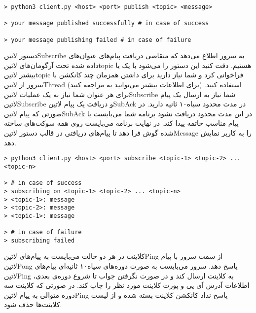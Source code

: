 \documentclass[]{article}
\begin{document}
  \begin{latin}
  \begin{verbatim}
> python3 client.py <host> <port> publish <topic> <message>

> your message published successfully # in case of success

> your message publishing failed # in case of failure
  \end{verbatim}
  \end{latin}

  دستور ‌لاتین{Subscribe} به سرور اطلاع می‌دهد که متقاضی دریافت پیام‌های عنوان‌های داده شده تحت آرگومان‌های ‌لاتین{topic} هستیم.
  دقت کنید این دستور را می‌شود با یک یا بیشتر ‌لاتین{topic} فراخوانی کرد و شما نیاز دارید برای داشتن همزمان چند کانکشن با سرور از ‌لاتین{Thread} (برای اطلاعات بیشتر می‌توانید به  مراجعه کنید) استفاده کنید.
  برای هر عنوان شما نیاز به یک عملیات ‌لاتین{Subscribe} شما نیاز به ارسال یک پیام ‌لاتین{Subscribe} و دریافت یک پیام ‌لاتین{SubAck} در مدت محدود ‌سیاه{۱۰ ثانیه} دارید.
  در صورتی که پیام ‌لاتین{SubAck} در این مدت محدود دریافت نشود برنامه شما می‌بایست با پیام مناسب خاتمه پیدا کند.
  در نهایت برنامه می‌بایست روی همه سوکت‌های ساخته شده گوش فرا دهد تا پیام‌های دریافتی در قالب دستور ‌لاتین{Message} را به کاربر نمایش دهد.

  \begin{latin}
  \begin{verbatim}
> python3 client.py <host> <port> subscribe <topic-1> <topic-2> ... <topic-n>

> # in case of success
> subscribing on <topic-1> <topic-2> ... <topic-n>
> <topic-1>: message
> <topic-2>: message
> <topic-1>: message

> # in case of failure
> subscribing failed
  \end{verbatim}
  \end{latin}



   کلاینت در هر دو حالت می‌بایست به پیام‌های ‌لاتین{Ping} از سمت سرور با پیام ‌لاتین{Pong} پاسخ دهد.
   سرور می‌بایست به صورت دوره‌های ‌سیاه{۱۰ ثانیه‌ای} پیام‌های ‌لاتین{Ping} به کلاینت ارسال کند و در صورت نگرفتن جواب تا شروع دوره‌ی بعدی، اطلاعات آدرس آی پی و پورت کلاینت مورد نظر را چاپ کند.
   در صورتی که کلاینت سه دوره متوالی به پیام ‌لاتین{Ping} پاسخ نداد کانکشن کلاینت بسته شده و از لیست کلاینت‌ها حذف شود.
\end{document}
